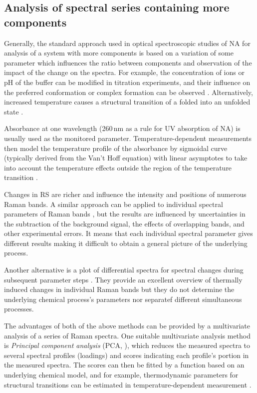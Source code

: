 \subsection{Analysis of spectral series containing more components}

Generally, the standard approach used in optical spectroscopic studies of NA
for analysis of a system with more components is based on a variation of some
parameter which influences the ratio between components and observation of the
impact of the change on the spectra.
For example, the concentration of ions or pH of the buffer can be modified in
titration experiments, and their influence on the preferred conformation or
complex formation can be observed
\parencite{Klener2015}.
Alternatively, increased temperature causes a structural transition of a folded
into an unfolded state
\parencite{Klener2021}.

Absorbance at one wavelength (260\,nm as a rule for UV absorption of NA) is
usually used as the monitored parameter.
Temperature-dependent measurements then model the temperature profile of the
absorbance by sigmoidal curve (typically derived from the Van't Hoff equation)
with linear asymptotes to take into account the temperature effects outside
the region of the temperature transition
\parencite{%
	Owczarzy1997,%
	Owczarzy2005,%
	Mergny2009%
}.

Changes in RS are richer and influence the intensity and positions of numerous
Raman bands.
A similar approach can be applied to individual spectral parameters of Raman
bands
\parencite{%
	Duguid1996,%
	Mukerji1996,%
	Mercier1999,%
	Baumruk2001,%
	Movileanu2002a,%
	Knee2008%
},
but the results are influenced by uncertainties in the subtraction of the
background signal, the effects of overlapping bands, and other experimental
errors.
It means that each individual spectral parameter gives different results making
it difficult to obtain a general picture of the underlying process.

Another alternative is a plot of differential spectra for spectral changes
during subsequent parameter steps
\parencite{%
	Duguid1996,%
	Baumruk2001,%
	Chan1997,%
	Movileanu1999,%
	Movileanu2002%
}.
They provide an excellent overview of thermally induced changes in individual
Raman bands but they do not determine the underlying chemical process's
parameters nor separatef different simultaneous processes.

The advantages of both of the above methods can be provided by a multivariate
analysis of a series of Raman spectra.
One suitable multivariate analysis method is
\emph{Principal component analysis} (PCA,
\cite{%
	Wold1987,%
	Malinowski2002%
}),
which reduces the measured spectra to several spectral profiles (loadings) and
scores indicating each profile's portion in the measured spectra.
The scores can then be fitted by a function based on an underlying chemical
model, and for example, thermodynamic parameters for structural transitions
can be estimated in temperature-dependent measurement
\parencite{Nemecek2013}.

